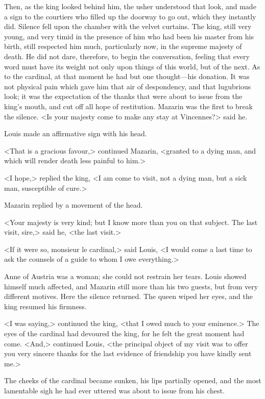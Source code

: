 Then, as the king looked behind him, the usher understood that look, and made a sign to the courtiers who filled up the doorway to go out, which they instantly did. Silence fell upon the chamber with the velvet curtains. The king, still very young, and very timid in the presence of him who had been his master from his birth, still respected him much, particularly now, in the supreme majesty of death. He did not dare, therefore, to begin the conversation, feeling that every word must have its weight not only upon things of this world, but of the next. As to the cardinal, at that moment he had but one thought—his donation. It was not physical pain which gave him that air of despondency, and that lugubrious look; it was the expectation of the thanks that were about to issue from the king's mouth, and cut off all hope of restitution. Mazarin was the first to break the silence. <Is your majesty come to make any stay at Vincennes?> said he.

Louis made an affirmative sign with his head.

<That is a gracious favour,> continued Mazarin, <granted to a dying man, and which will render death less painful to him.>

<I hope,> replied the king, <I am come to visit, not a dying man, but a sick man, susceptible of cure.>

Mazarin replied by a movement of the head.

<Your majesty is very kind; but I know more than you on that subject. The last visit, sire,> said he, <the last visit.>

<If it were so, monsieur le cardinal,> said Louis, <I would come a last time to ask the counsels of a guide to whom I owe everything.>

Anne of Austria was a woman; she could not restrain her tears. Louis showed himself much affected, and Mazarin still more than his two guests, but from very different motives. Here the silence returned. The queen wiped her eyes, and the king resumed his firmness.

<I was saying,> continued the king, <that I owed much to your eminence.> The eyes of the cardinal had devoured the king, for he felt the great moment had come. <And,> continued Louis, <the principal object of my visit was to offer you very sincere thanks for the last evidence of friendship you have kindly sent me.>

The cheeks of the cardinal became sunken, his lips partially opened, and the most lamentable sigh he had ever uttered was about to issue from his chest.

